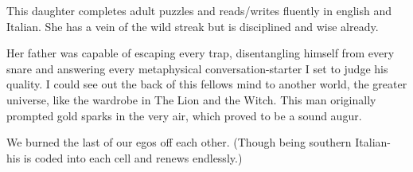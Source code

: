 \begin{footnotesize}
\begin{sffamily}
This daughter completes adult puzzles and reads/writes fluently in english and Italian. She has a vein of the wild streak but is disciplined and wise already.

Her father was capable of escaping every trap, disentangling himself from every snare and answering every metaphysical conversation-starter I set to judge his quality. I could see out the back of this fellows mind to another world, the greater universe, like the wardrobe in The Lion and the Witch. This man originally prompted gold sparks in the very air, which proved to be a sound augur.

We burned the last of our egos off each other. (Though being southern Italian- his is coded into each cell and renews endlessly.)


\hfill

\end{sffamily}
\end{footnotesize}

